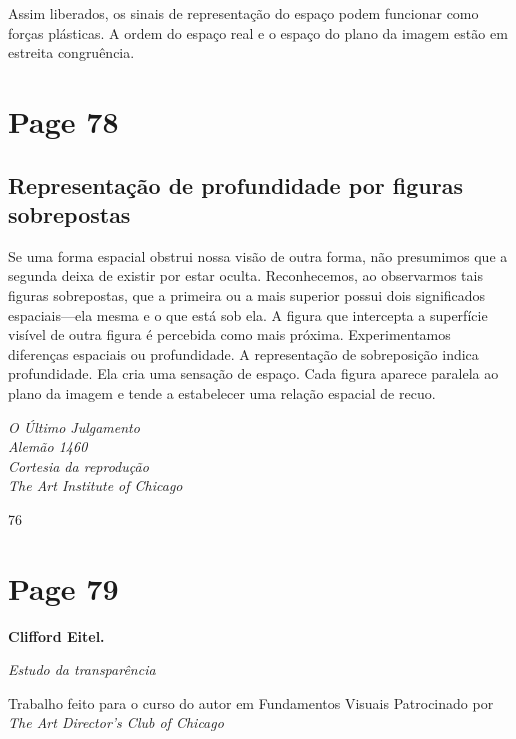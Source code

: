 \documentclass[a4paper]{article}
\begin{document}
Assim liberados, os sinais de representação do espaço podem funcionar como forças plásticas. A ordem do espaço real e o espaço do plano da imagem estão em estreita congruência.

\newpage
\section*{Page 78}

\subsection*{Representação de profundidade por figuras sobrepostas}

Se uma forma espacial obstrui nossa visão de outra forma, não presumimos que a segunda deixa de existir por estar oculta. Reconhecemos, ao observarmos tais figuras sobrepostas, que a primeira ou a mais superior possui dois significados espaciais---ela mesma e o que está sob ela. A figura que intercepta a superfície visível de outra figura é percebida como mais próxima. Experimentamos diferenças espaciais ou profundidade. A representação de sobreposição indica profundidade. Ela cria uma sensação de espaço. Cada figura aparece paralela ao plano da imagem e tende a estabelecer uma relação espacial de recuo.

\vspace{\baselineskip}

\raggedright
\textit{O Último Julgamento} \\
\textit{Alemão 1460} \\
\textit{Cortesia da reprodução} \\
\textit{The Art Institute of Chicago}

76

\newpage
\section*{Page 79}

\raggedright %

\parbox[t]{0.45\textwidth}{ %
\textbf{\large Clifford Eitel.}

\textit{Estudo da transparência}

Trabalho feito para o curso do autor
em Fundamentos Visuais
Patrocinado por
\textit{The Art Director's Club of Chicago}
}

\vspace{2em} %
\end{document}
